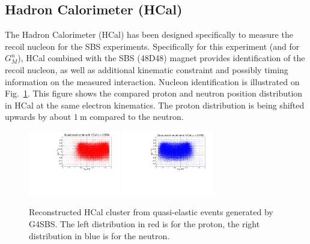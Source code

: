 \subsection{Hadron Calorimeter (HCal)}
%
\label{sec:expsetup_hcal}

The Hadron Calorimeter (HCal) has been designed specifically to measure the recoil nucleon for the SBS experiments. Specifically for this experiment (and for $G_M^n$), HCal combined with the SBS (48D48) magnet provides identification of the recoil nucleon, as well as additional kinematic constraint and possibly timing information on the measured interaction.
Nucleon identification is illustrated on Fig.~\ref{fig:hcal_nuclimprint}. This figure shows the compared proton and neutron position distribution in HCal at the same electron kinematics. The proton distribution is being shifted upwards by about $1~\mathrm{m}$ compared to the neutron.
%
\begin{figure}[!h]
  \begin{center}
    \includegraphics[angle=90,width=4cm]{Plots/HCal_p.pdf}
    \includegraphics[angle=90,width=4cm]{Plots/HCal_n.pdf}
    \caption{Reconstructed HCal cluster from quasi-elastic events generated by G4SBS. The left distribution in red is for the proton, the right distribution in blue is for the neutron.}
    \label{fig:hcal_nuclimprint}
  \end{center}
\end{figure}
%


